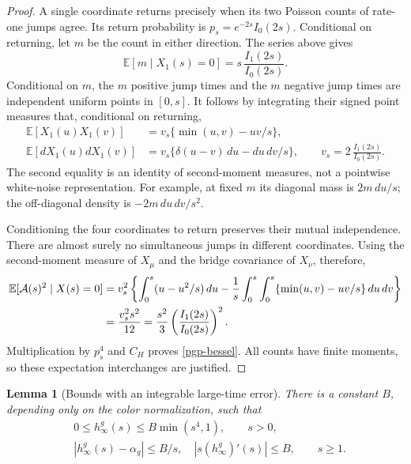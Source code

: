\documentclass[11pt]{article}
\newtheorem{lemma}[theorem]{Lemma}
\theoremstyle{remark}
\begin{document}
\begin{proof}
A single coordinate returns precisely when its two
Poisson counts of rate-one jumps agree. Its return
probability is \(p_s=e^{-2s}I_0(2s)\). Conditional
on returning, let \(m\) be the count in either
direction. The series above gives
\[
 \mathbb E[m\mid X_1(s)=0]
          =s\,\frac{I_1(2s)}{I_0(2s)}.
\]
Conditional on \(m\), the \(m\) positive jump times
and the \(m\) negative jump times are independent
uniform points in \([0,s]\). It follows by integrating
their signed point measures that, conditional on
returning,
\begin{align*}
 \mathbb E[X_1(u)X_1(v)]
   &=v_s\{\min(u,v)-uv/s\},\\
 \mathbb E[dX_1(u)dX_1(v)]
   &=v_s\{\delta(u-v)\,du-d u\,d v/s\},\qquad
 v_s=2\,\frac{I_1(2s)}{I_0(2s)}.
\end{align*}
The second equality is an identity of second-moment
measures, not a pointwise white-noise representation.
For example, at fixed \(m\) its diagonal mass is
\(2m\,du/s\); the off-diagonal density is
\(-2m\,du\,dv/s^2\).

Conditioning the four coordinates to return preserves
their mutual independence. There are almost surely
no simultaneous jumps in different coordinates.
Using the second-moment measure of \(X_\mu\) and
the bridge covariance of \(X_\nu\), therefore,
\begin{align*}
 \mathbb E[{\cal A}(s)^2\mid X(s)=0]
 &=v_s^2\left\{
      \int_0^s(u-u^2/s)\,du
       -\frac1s\int_0^s\int_0^s
                         \{\min(u,v)-uv/s\}\,du\,dv\right\}\\
 &=\frac{v_s^2s^2}{12}
   =\frac{s^2}{3}\left(\frac{I_1(2s)}{I_0(2s)}\right)^2.
\end{align*}
Multiplication by \(p_s^4\) and \(C_H\) proves
\eqref{pgp-bessel}. All counts have finite moments,
so these expectation interchanges are justified.
\end{proof}

\begin{lemma}[Bounds with an integrable large-time error]
\label{pgp-asymptotics}
There is a constant \(B\), depending only on the color
normalization, such that
\begin{align}
 &0\le h_\infty^g(s)\le B\min(s^4,1),\qquad s>0,
                                      \label{pgp-uniform-bound}\\
 &|h_\infty^g(s)-\alpha_g|\le B/s,\quad
   |s(h_\infty^g)'(s)|\le B,\qquad s\ge1.
                                      \label{pgp-asymptotic-bound}
\end{align}
\end{lemma}
\end{document}
